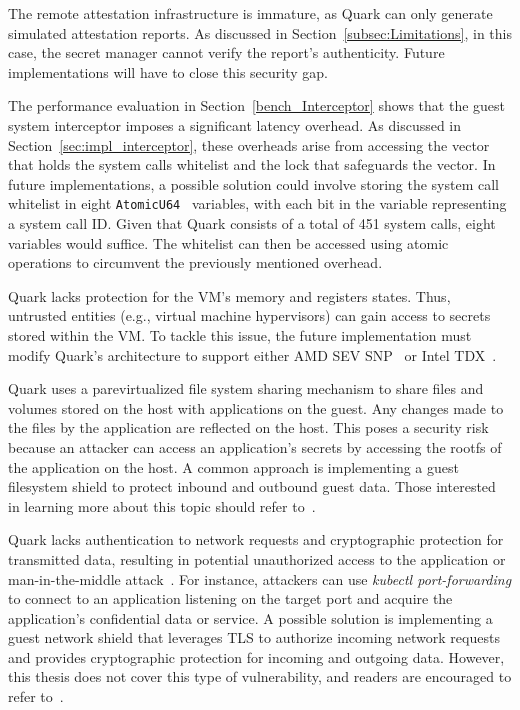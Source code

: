 The remote attestation infrastructure is immature, as Quark can only generate simulated attestation reports. As discussed in Section~\ref{subsec:Limitations}, in this case, the secret manager cannot verify the report's authenticity. Future implementations will have to close this security 
gap.

The performance evaluation in Section~\ref{bench_Interceptor} shows that the guest system interceptor imposes a significant latency overhead. As discussed in Section~\ref{sec:impl_interceptor}, these overheads arise from accessing the vector that holds the system calls whitelist and the lock 
that safeguards the vector. In future implementations, a possible solution could involve storing the system call whitelist in eight \texttt{AtomicU64}~\cite*{rust_automic_u64} variables, with each bit in the variable representing a system call ID. Given that Quark consists of a total of 451 system calls, eight variables would suffice. The whitelist can then be accessed using atomic 
operations to circumvent the previously mentioned overhead.

Quark lacks protection for the VM's memory and registers states. Thus, untrusted entities (e.g., virtual machine hypervisors) can gain access to secrets stored within the VM. To tackle this issue, the future implementation must modify Quark's architecture to support either 
AMD SEV SNP~\cite*{SEV_SNP_white_book} or Intel TDX~\cite*{Intel_tdx_whitepaper}.

Quark uses a parevirtualized file system sharing mechanism to share files and volumes stored on the host with applications on the guest. Any changes made to the files by the application are reflected on the host. This poses a security risk because an attacker can access an application's secrets by 
accessing the rootfs of the application on the host. A common approach is implementing a guest filesystem shield to protect inbound and outbound guest data. Those interested in learning more about this topic should refer to~\cite*{file_system_shield}.

Quark lacks authentication to network requests and cryptographic protection for transmitted data, resulting in potential unauthorized access to the application or man-in-the-middle attack~\cite*{Man_in_the_middle_attack}. For instance, attackers can use \emph{kubectl port-forwarding} to connect to an 
application listening on the target port and acquire the application's confidential data or service. A possible solution is implementing a guest network shield that leverages TLS\cite*{tls_record_size} to authorize incoming network requests and provides cryptographic protection for incoming and 
outgoing data. However, this thesis does not cover this type of vulnerability, and readers are encouraged to refer to~\cite*{network_shiled}.

